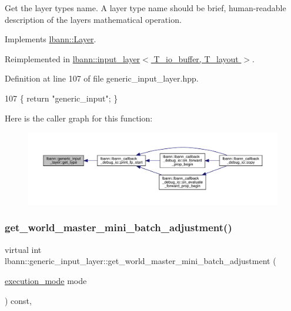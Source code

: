 Get the layer type\textquotesingle{}s name. A layer type name should be brief, human-\/readable description of the layer\textquotesingle{}s mathematical operation. 

Implements \hyperlink{classlbann_1_1Layer_a0fa0ea9160b490c151c0a17fde4f7239}{lbann\+::\+Layer}.



Reimplemented in \hyperlink{classlbann_1_1input__layer_af596126d1b2d1604743906d04d32419b}{lbann\+::input\+\_\+layer$<$ T\+\_\+io\+\_\+buffer, T\+\_\+layout $>$}.



Definition at line 107 of file generic\+\_\+input\+\_\+layer.\+hpp.


\begin{DoxyCode}
107 \{ \textcolor{keywordflow}{return} \textcolor{stringliteral}{"generic\_input"}; \}
\end{DoxyCode}
Here is the caller graph for this function\+:\nopagebreak
\begin{figure}[H]
\begin{center}
\leavevmode
\includegraphics[width=350pt]{classlbann_1_1generic__input__layer_a5392ea11b5eb98a8040bf5b5deed836a_icgraph}
\end{center}
\end{figure}
\mbox{\label{classlbann_1_1generic__input__layer_a1c2a503d4009b6360d96db128796983c}} 
\subsubsection{\texorpdfstring{get\+\_\+world\+\_\+master\+\_\+mini\+\_\+batch\+\_\+adjustment()}{get\_world\_master\_mini\_batch\_adjustment()}\hspace{0.1cm}{\footnotesize\ttfamily [1/2]}}
{\footnotesize\ttfamily virtual int lbann\+::generic\+\_\+input\+\_\+layer\+::get\+\_\+world\+\_\+master\+\_\+mini\+\_\+batch\+\_\+adjustment (\begin{DoxyParamCaption}\item[{\hyperlink{base_8hpp_a2781a159088df64ed7d47cc91c4dc0a8}{execution\+\_\+mode}}]{mode }\end{DoxyParamCaption}) const\hspace{0.3cm}{\ttfamily [inline]}, {\ttfamily [virtual]}}



